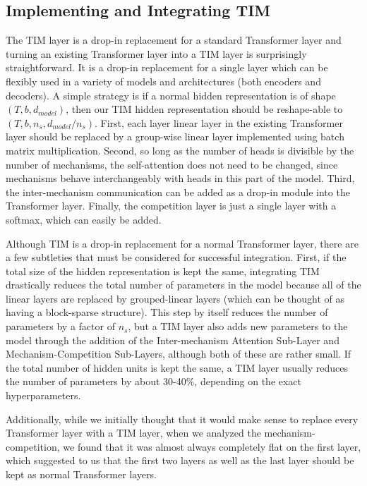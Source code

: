 \documentclass{article}
\begin{document}
\subsection{Implementing and Integrating TIM}

\label{sec:integrate}

The TIM layer is a drop-in replacement for a standard Transformer layer and turning an existing Transformer layer into a TIM layer is surprisingly straightforward.  It is a drop-in replacement for a single layer which can be flexibly used in a variety of models and architectures (both encoders and decoders).  A simple strategy is if a normal hidden representation is of shape $(T,b,d_{model})$, then our TIM hidden representation should be reshape-able to $(T,b,n_s,d_{model}/n_s)$. First, each layer linear layer in the existing Transformer layer should be replaced by a group-wise linear layer implemented using batch matrix multiplication.  
Second, so long as the number of heads is divisible by the number of mechanisms, the self-attention does not need to be changed, since mechanisms behave interchangeably with heads in this part of the model.  
Third, the inter-mechanism communication can be added as a drop-in module into the Transformer layer.  
Finally, the competition layer is just a single layer with a softmax, which can easily be added.  

Although TIM is a drop-in replacement for a normal Transformer layer, there are a few subtleties that must be considered for successful integration.  First, if the total size of the hidden representation is kept the same, integrating TIM drastically reduces the total number of parameters in the model because all of the linear layers are replaced by grouped-linear layers (which can be thought of as having a block-sparse structure).  This step by itself reduces the number of parameters by a factor of $n_s$, but a TIM layer also adds new parameters to the model through the addition of the Inter-mechanism Attention Sub-Layer and Mechanism-Competition Sub-Layers, although both of these are rather small.  If the total number of hidden units is kept the same, a TIM layer usually reduces the number of parameters by about 30-40\%, depending on the exact hyperparameters.  


Additionally, while we initially thought that it would make sense to replace every Transformer layer with a TIM layer, when we analyzed the mechanism-competition, we found that it was almost always completely flat on the first layer, which suggested to us that the first two layers as well as the last layer should be kept as normal Transformer layers.  
\end{document}
